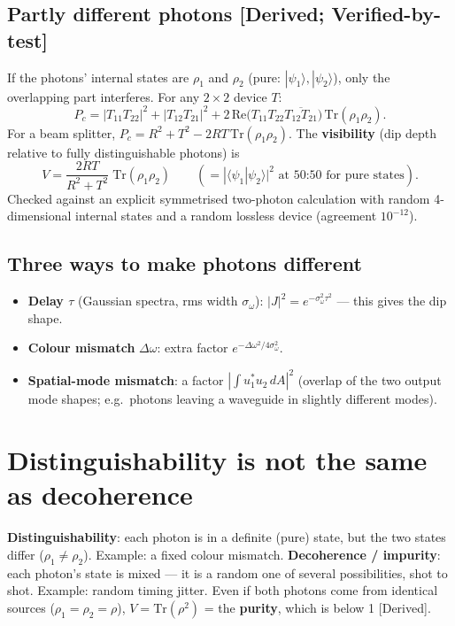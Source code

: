 \documentclass[10pt,a4paper]{article}
\newcommand{\evd}[1]{\textsf{\small[#1]}}
\begin{document}
\subsection{Partly different photons \evd{Derived; Verified-by-test}}
If the photons' internal states are $\rho_1$ and $\rho_2$ (pure: $|\psi_1\rangle,|\psi_2\rangle$), only the overlapping part interferes. For any $2\times2$ device $T$:
\[
P_c=|T_{11}T_{22}|^2+|T_{12}T_{21}|^2+2\,\mathrm{Re}\big(T_{11}T_{22}\overline{T_{12}T_{21}}\big)\,\mathrm{Tr}(\rho_1\rho_2).
\]
For a beam splitter, $P_c=R^2+T^2-2RT\,\mathrm{Tr}(\rho_1\rho_2)$. The \textbf{visibility} (dip depth relative to fully distinguishable photons) is
\[
\boxed{V=\frac{2RT}{R^2+T^2}\;\mathrm{Tr}(\rho_1\rho_2)}\qquad(=|\langle\psi_1|\psi_2\rangle|^2\text{ at 50:50 for pure states}).
\]
Checked against an explicit symmetrised two-photon calculation with random 4-dimensional internal states and a random lossless device (agreement $10^{-12}$).

\subsection{Three ways to make photons different}
\begin{itemize}[itemsep=1pt]
\item \textbf{Delay $\tau$} (Gaussian spectra, rms width $\sigma_\omega$): $|J|^2=e^{-\sigma_\omega^2\tau^2}$ --- this gives the dip shape.
\item \textbf{Colour mismatch} $\Delta\omega$: extra factor $e^{-\Delta\omega^2/4\sigma_\omega^2}$.
\item \textbf{Spatial-mode mismatch}: a factor $|\int u_1^*u_2\,dA|^2$ (overlap of the two output mode shapes; e.g.\ photons leaving a waveguide in slightly different modes).
\end{itemize}

\section{Distinguishability is not the same as decoherence}
\textbf{Distinguishability}: each photon is in a definite (pure) state, but the two states differ ($\rho_1\ne\rho_2$). Example: a fixed colour mismatch.
\textbf{Decoherence / impurity}: each photon's state is mixed --- it is a random one of several possibilities, shot to shot. Example: random timing jitter. Even if both photons come from identical sources ($\rho_1=\rho_2=\rho$), $V=\mathrm{Tr}(\rho^2)$ = the \textbf{purity}, which is below 1 \evd{Derived}.
\end{document}
